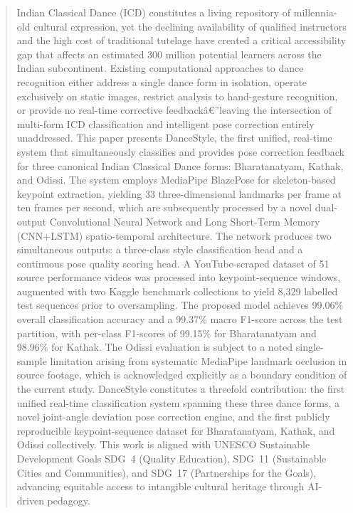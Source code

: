 \documentclass[journal]{IEEEtran}
\begin{document}
\begin{abstract}
Indian Classical Dance (ICD) constitutes a living repository of
millennia-old cultural expression, yet the declining availability of
qualified instructors and the high cost of traditional tutelage have
created a critical accessibility gap that affects an estimated
300 million potential learners across the Indian subcontinent.
Existing computational approaches to dance recognition either address
a single dance form in isolation, operate exclusively on static images,
restrict analysis to hand-gesture recognition, or provide no real-time
corrective feedbackâ€”leaving the intersection of multi-form ICD
classification and intelligent pose correction entirely unaddressed.
This paper presents DanceStyle, the first unified, real-time system that
simultaneously classifies and provides pose correction feedback for
three canonical Indian Classical Dance forms: Bharatanatyam, Kathak,
and Odissi. The system employs MediaPipe BlazePose for
skeleton-based keypoint extraction, yielding 33 three-dimensional
landmarks per frame at ten frames per second, which are subsequently
processed by a novel dual-output Convolutional Neural Network and Long
Short-Term Memory (CNN+LSTM) spatio-temporal architecture. The network
produces two simultaneous outputs: a three-class style classification
head and a continuous pose quality scoring head. A YouTube-scraped
dataset of 51 source performance videos was processed into
keypoint-sequence windows, augmented with two Kaggle benchmark
collections to yield 8,329 labelled test sequences prior to
oversampling. The proposed model achieves 99.06\% overall classification
accuracy and a 99.37\% macro F1-score across the test partition,
with per-class F1-scores of 99.15\% for Bharatanatyam and 98.96\%
for Kathak. The Odissi evaluation is subject to a noted single-sample
limitation arising from systematic MediaPipe landmark occlusion in
source footage, which is acknowledged explicitly as a boundary condition
of the current study. DanceStyle constitutes a threefold contribution:
the first unified real-time classification system spanning these three
dance forms, a novel joint-angle deviation pose correction engine, and
the first publicly reproducible keypoint-sequence dataset for
Bharatanatyam, Kathak, and Odissi collectively. This work is aligned
with UNESCO Sustainable Development Goals SDG~4 (Quality Education),
SDG~11 (Sustainable Cities and Communities), and SDG~17 (Partnerships
for the Goals), advancing equitable access to intangible cultural
heritage through AI-driven pedagogy.
\end{abstract}
\end{document}

